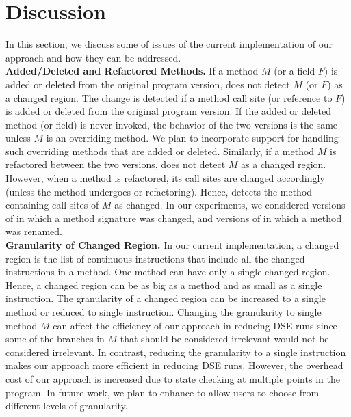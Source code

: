 
\section{Discussion}

\label{sec:discussion}
In this section, we discuss some of issues of the current implementation of our approach and
how they can be addressed.
\\ \textbf{Added/Deleted and Refactored Methods.} If a method $M$ (or a field $F$) is added or deleted from the original program version,  does not detect $M$ (or $F$) as a changed region. The change is detected if a method call site (or reference to $F$) is added or deleted from the original program version. If the added or deleted method (or field) is never invoked, the behavior of the two versions is the same unless $M$  is an overriding method. We plan to incorporate support for handling such overriding methods that are added or deleted. Similarly, if a method $M$ is refactored between the two versions,  does not detect $M$ as a changed region. However, when a method is refactored, its call sites are changed accordingly (unless the method undergoes  or  refactoring). Hence,  detects the method containing call sites of $M$ as changed. In our experiments, we considered versions of  in which a method signature was changed, and versions of  in which a method was renamed.
\\ \textbf{Granularity of Changed Region.} In our current implementation, a changed region is the list of continuous instructions that include all the changed instructions in a method. One method can have only a single changed region. Hence, a changed region can be as big as a method and as small as a single instruction. The granularity of a changed region can be increased to a single method or reduced to single instruction. Changing the granularity to single method $M$ can affect the efficiency of our approach in reducing DSE runs since some of the branches in $M$ that should be considered irrelevant would not be considered irrelevant. In contrast, reducing the granularity to a single instruction makes our approach more efficient in reducing DSE runs. However, the overhead cost of our approach is increased due to state checking at multiple points in the program. In future work, we plan to enhance  to allow users to choose from different levels of granularity. 
